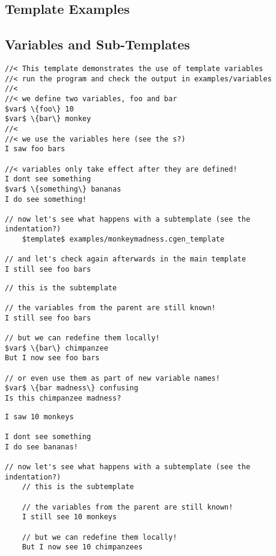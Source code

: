 \documentclass{settings/TU_Delft_Report}
\begin{document}
\begin{appendices}
\chapter{Template Examples}
\section{Variables and Sub-Templates} \label{ex1}
\begin{lstlisting}[caption={base template : variables},label={ex1:variables},language={}]
//< This template demonstrates the use of template variables
//< run the program and check the output in examples/variables
//<
//< we define two variables, foo and bar
$var$ \{foo\} 10
$var$ \{bar\} monkey
//<
//< we use the variables here (see the s?)
I saw foo bars

//< variables only take effect after they are defined!
I dont see something
$var$ \{something\} bananas
I do see something!

// now let's see what happens with a subtemplate (see the indentation?)
	$template$ examples/monkeymadness.cgen_template

// and let's check again afterwards in the main template
I still see foo bars
\end{lstlisting}

\begin{lstlisting}[caption={sub-template : monkeymadness},label={ex1:mmadness},language={}]
// this is the subtemplate

// the variables from the parent are still known!
I still see foo bars

// but we can redefine them locally!
$var$ \{bar\} chimpanzee
But I now see foo bars

// or even use them as part of new variable names!
$var$ \{bar madness\} confusing
Is this chimpanzee madness?
\end{lstlisting}

\newpage
\begin{lstlisting}[caption={result},label={ex1:result},language={}]
I saw 10 monkeys

I dont see something
I do see bananas!

// now let's see what happens with a subtemplate (see the indentation?)
	// this is the subtemplate
	
	// the variables from the parent are still known!
	I still see 10 monkeys
	
	// but we can redefine them locally!
	But I now see 10 chimpanzees
	

\end{lstlisting}
\end{appendices}
\end{document}
